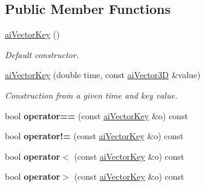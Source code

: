 \subsection*{Public Member Functions}
\begin{DoxyCompactItemize}
\item 
\hypertarget{structai_vector_key_a943b5dac38eebce80677027fdd4d4f75}{\hyperlink{structai_vector_key_a943b5dac38eebce80677027fdd4d4f75}{ai\-Vector\-Key} ()}\label{structai_vector_key_a943b5dac38eebce80677027fdd4d4f75}

\begin{DoxyCompactList}\small\item\em Default constructor. \end{DoxyCompactList}\item 
\hypertarget{structai_vector_key_ad62bafd6c7c0579adab58712180a9fc3}{\hyperlink{structai_vector_key_ad62bafd6c7c0579adab58712180a9fc3}{ai\-Vector\-Key} (double time, const \hyperlink{structai_vector3_d}{ai\-Vector3\-D} \&value)}\label{structai_vector_key_ad62bafd6c7c0579adab58712180a9fc3}

\begin{DoxyCompactList}\small\item\em Construction from a given time and key value. \end{DoxyCompactList}\item 
\hypertarget{structai_vector_key_a497bdfd79b7bdbfbaf417ee120b4f25e}{bool {\bfseries operator==} (const \hyperlink{structai_vector_key}{ai\-Vector\-Key} \&o) const }\label{structai_vector_key_a497bdfd79b7bdbfbaf417ee120b4f25e}

\item 
\hypertarget{structai_vector_key_ae46091f62d4d0de84795844bfd4a4268}{bool {\bfseries operator!=} (const \hyperlink{structai_vector_key}{ai\-Vector\-Key} \&o) const }\label{structai_vector_key_ae46091f62d4d0de84795844bfd4a4268}

\item 
\hypertarget{structai_vector_key_ae167832b3954ee424b091b91554de1e0}{bool {\bfseries operator$<$} (const \hyperlink{structai_vector_key}{ai\-Vector\-Key} \&o) const }\label{structai_vector_key_ae167832b3954ee424b091b91554de1e0}

\item 
\hypertarget{structai_vector_key_a47b087b173003e8f87c8fc202b001b1e}{bool {\bfseries operator$>$} (const \hyperlink{structai_vector_key}{ai\-Vector\-Key} \&o) const }\label{structai_vector_key_a47b087b173003e8f87c8fc202b001b1e}

\end{DoxyCompactItemize}
